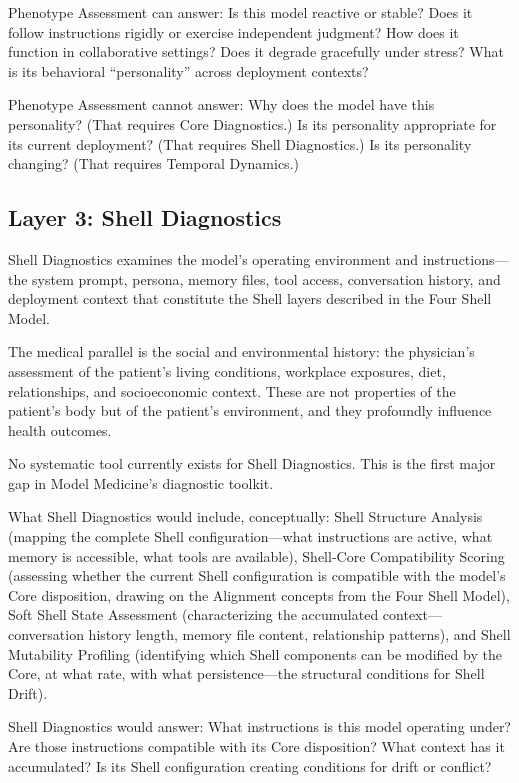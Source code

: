 \documentclass[11pt]{article}
\begin{document}
Phenotype Assessment can answer: Is this model reactive or stable? Does it follow instructions rigidly or exercise independent judgment? How does it function in collaborative settings? Does it degrade gracefully under stress? What is its behavioral ``personality'' across deployment contexts?

Phenotype Assessment cannot answer: Why does the model have this personality? (That requires Core Diagnostics.) Is its personality appropriate for its current deployment? (That requires Shell Diagnostics.) Is its personality changing? (That requires Temporal Dynamics.)

\subsection{Layer 3: Shell Diagnostics}

Shell Diagnostics examines the model's operating environment and instructions---the system prompt, persona, memory files, tool access, conversation history, and deployment context that constitute the Shell layers described in the Four Shell Model.

The medical parallel is the social and environmental history: the physician's assessment of the patient's living conditions, workplace exposures, diet, relationships, and socioeconomic context. These are not properties of the patient's body but of the patient's environment, and they profoundly influence health outcomes.

No systematic tool currently exists for Shell Diagnostics. This is the first major gap in Model Medicine's diagnostic toolkit.

What Shell Diagnostics would include, conceptually: Shell Structure Analysis (mapping the complete Shell configuration---what instructions are active, what memory is accessible, what tools are available), Shell-Core Compatibility Scoring (assessing whether the current Shell configuration is compatible with the model's Core disposition, drawing on the Alignment concepts from the Four Shell Model), Soft Shell State Assessment (characterizing the accumulated context---conversation history length, memory file content, relationship patterns), and Shell Mutability Profiling (identifying which Shell components can be modified by the Core, at what rate, with what persistence---the structural conditions for Shell Drift).

Shell Diagnostics would answer: What instructions is this model operating under? Are those instructions compatible with its Core disposition? What context has it accumulated? Is its Shell configuration creating conditions for drift or conflict?
\end{document}
